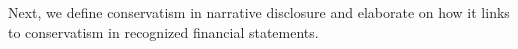 \documentclass[letterpaper,12pt]{article}
\begin{document}
\begin{spacing}{1.5}
\begin{comment}
\citeA[footnote 4, CON5-7]{fasbStatementFinancialAccounting1984} gives several examples on the complementary role of notes to financial statements:

\begin{adjustwidth}{1cm}{1cm}
\begin{singlespace}
\indent \textit{For example, notes provide essential descriptive information for long-term obligations, including when amounts are due, what interest they bear, and whether important restrictions are imposed by related covenants. For inventory, the notes provide information on the measurement method used---FIFO cost, LIFO cost, current market value, etc. For an estimated litigation liability, an extended discussion of the circumstances, counsel's opinions, and the basis for management's judgment may all be provided in the notes. For sales, useful information about revenue recognition policies may appear only in the notes (FASB Statement No. 47, Disclosure of Long-Term Obligations; ARB No. 43, Chapter 4, ``Inventory Pricing", statement 8; FASB Statement No. 5, Accounting for Contingencies, par. 10; and APB Statement 4, par. 199)}.
\end{singlespace}
\end{adjustwidth}
\end{comment}

\begin{comment}
\begin{quote}\label{hyp:h2a}
\textit{\textbf{H2a:} Narrative conservatism complements recognition conservatism.}
\end{quote}

\begin{quote}\label{hyp:h2b}
\textit{\textbf{H2b:} Narrative conservatism  supplements recognition conservatism.}
\end{quote}
\end{comment}

Next, we define conservatism in narrative disclosure and elaborate on how it links to conservatism in recognized financial statements.


\end{spacing}
\end{document}
